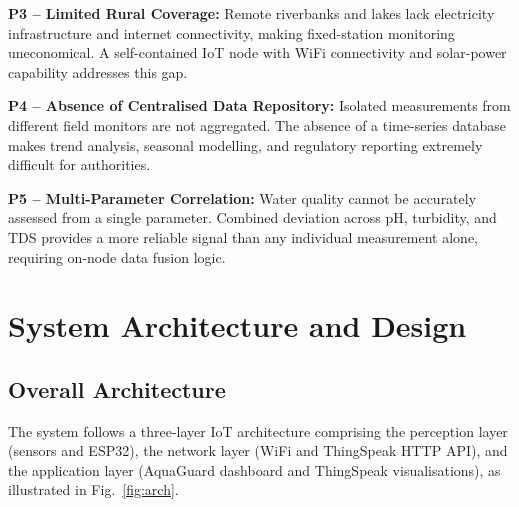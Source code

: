 \documentclass[12pt,a4paper]{article}
\begin{document}
\textbf{P3 -- Limited Rural Coverage:}
Remote riverbanks and lakes lack electricity infrastructure and
internet connectivity, making fixed-station monitoring
uneconomical. A self-contained IoT node with WiFi connectivity
and solar-power capability addresses this gap.

\textbf{P4 -- Absence of Centralised Data Repository:}
Isolated measurements from different field monitors are not
aggregated. The absence of a time-series database makes trend
analysis, seasonal modelling, and regulatory reporting extremely
difficult for authorities.

\textbf{P5 -- Multi-Parameter Correlation:}
Water quality cannot be accurately assessed from a single
parameter. Combined deviation across pH, turbidity, and TDS
provides a more reliable signal than any individual measurement
alone, requiring on-node data fusion logic.

\section{System Architecture and Design}
\label{sec:architecture}

\subsection{Overall Architecture}

The system follows a three-layer IoT architecture comprising
the perception layer (sensors and ESP32), the network layer
(WiFi and ThingSpeak HTTP API), and the application layer
(AquaGuard dashboard and ThingSpeak visualisations), as
illustrated in Fig.~\ref{fig:arch}.
\end{document}
